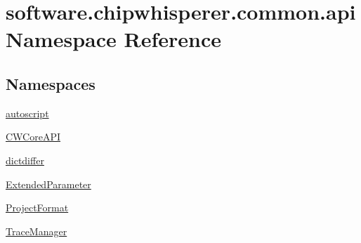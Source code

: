 \hypertarget{namespacesoftware_1_1chipwhisperer_1_1common_1_1api}{}\section{software.\+chipwhisperer.\+common.\+api Namespace Reference}
\label{namespacesoftware_1_1chipwhisperer_1_1common_1_1api}
\subsection*{Namespaces}
\begin{DoxyCompactItemize}
\item 
 \hyperlink{namespacesoftware_1_1chipwhisperer_1_1common_1_1api_1_1autoscript}{autoscript}
\item 
 \hyperlink{namespacesoftware_1_1chipwhisperer_1_1common_1_1api_1_1CWCoreAPI}{C\+W\+Core\+A\+P\+I}
\item 
 \hyperlink{namespacesoftware_1_1chipwhisperer_1_1common_1_1api_1_1dictdiffer}{dictdiffer}
\item 
 \hyperlink{namespacesoftware_1_1chipwhisperer_1_1common_1_1api_1_1ExtendedParameter}{Extended\+Parameter}
\item 
 \hyperlink{namespacesoftware_1_1chipwhisperer_1_1common_1_1api_1_1ProjectFormat}{Project\+Format}
\item 
 \hyperlink{namespacesoftware_1_1chipwhisperer_1_1common_1_1api_1_1TraceManager}{Trace\+Manager}
\end{DoxyCompactItemize}
